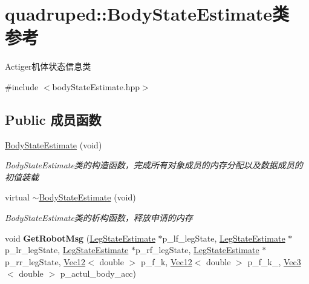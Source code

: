 \hypertarget{classquadruped_1_1BodyStateEstimate}{}\section{quadruped\+:\+:Body\+State\+Estimate类 参考}
\label{classquadruped_1_1BodyStateEstimate}


Actiger机体状态信息类  




{\ttfamily \#include $<$body\+State\+Estimate.\+hpp$>$}

\subsection*{Public 成员函数}
\begin{DoxyCompactItemize}
\item 
\mbox{\label{classquadruped_1_1BodyStateEstimate_a3b0db8c7b7cf21b040f3fbe15dd02b7e}} 
\hyperlink{classquadruped_1_1BodyStateEstimate_a3b0db8c7b7cf21b040f3fbe15dd02b7e}{Body\+State\+Estimate} (void)
\begin{DoxyCompactList}\small\item\em Body\+State\+Estimate类的构造函数，完成所有对象成员的内存分配以及数据成员的初值装载 \end{DoxyCompactList}\item 
\mbox{\label{classquadruped_1_1BodyStateEstimate_ae223eff98ecc03c171df9c97db54a0d0}} 
virtual \hyperlink{classquadruped_1_1BodyStateEstimate_ae223eff98ecc03c171df9c97db54a0d0}{$\sim$\+Body\+State\+Estimate} (void)
\begin{DoxyCompactList}\small\item\em Body\+State\+Estimate类的析构函数，释放申请的内存 \end{DoxyCompactList}\item 
\mbox{\label{classquadruped_1_1BodyStateEstimate_ab731b3e8b88e419328d057a90df7819d}} 
void {\bfseries Get\+Robot\+Msg} (\hyperlink{classquadruped_1_1LegStateEstimate}{Leg\+State\+Estimate} $\ast$p\+\_\+lf\+\_\+leg\+State, \hyperlink{classquadruped_1_1LegStateEstimate}{Leg\+State\+Estimate} $\ast$p\+\_\+lr\+\_\+leg\+State, \hyperlink{classquadruped_1_1LegStateEstimate}{Leg\+State\+Estimate} $\ast$p\+\_\+rf\+\_\+leg\+State, \hyperlink{classquadruped_1_1LegStateEstimate}{Leg\+State\+Estimate} $\ast$p\+\_\+rr\+\_\+leg\+State, \hyperlink{cppTypes_8h_a87f228860242acc66da2e58086d18cec}{Vec12}$<$ double $>$ p\+\_\+f\+\_\+k, \hyperlink{cppTypes_8h_a87f228860242acc66da2e58086d18cec}{Vec12}$<$ double $>$ p\+\_\+f\+\_\+k\+\_, \hyperlink{cppTypes_8h_a65c27bf97693676535dd0b30ea0ad399}{Vec3}$<$ double $>$ p\+\_\+actul\+\_\+body\+\_\+acc)
\end{DoxyCompactItemize}
